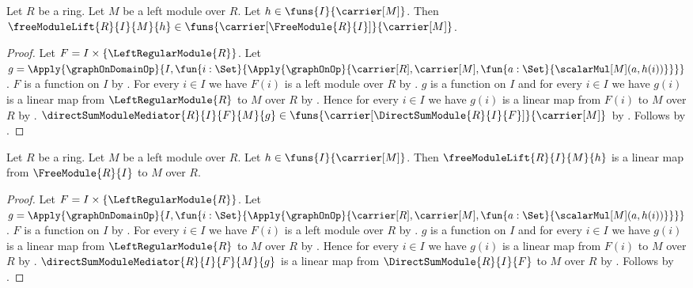 \begin{proposition}\label{free_module_lift_type}
    Let $R$ be a ring.
    Let $M$ be a left module over $R$.
    Let $h\in\funs{I}{\carrier[M]}$.
    Then
        $\freeModuleLift{R}{I}{M}{h}\in
            \funs{\carrier[\FreeModule{R}{I}]}{\carrier[M]}$.
\end{proposition}
\begin{proof}
    Let $F=I\times\{\LeftRegularModule{R}\}$.
    Let
        $g=\Apply{\graphOnDomainOp}{
            I,\fun{i:\Set}{
                \Apply{\graphOnOp}{
                    \carrier[R],\carrier[M],
                    \fun{a:\Set}{\scalarMul[M](a,h(i))}}}}$.
    $F$ is a function on $I$ by
        .
    For every $i\in I$ we have $F(i)$ is a left module over $R$ by
        .
    $g$ is a function on $I$ and for every $i\in I$ we have
        $g(i)$ is a linear map from $\LeftRegularModule{R}$ to $M$ over $R$ by
        .
    Hence for every $i\in I$ we have $g(i)$ is a linear map from
        $F(i)$ to $M$ over $R$ by
        .
    $\directSumModuleMediator{R}{I}{F}{M}{g}\in
        \funs{\carrier[\DirectSumModule{R}{I}{F}]}{\carrier[M]}$ by
        .
    Follows by
        .
\end{proof}

\begin{theorem}\label{free_module_lift_linear}
    Let $R$ be a ring.
    Let $M$ be a left module over $R$.
    Let $h\in\funs{I}{\carrier[M]}$.
    Then $\freeModuleLift{R}{I}{M}{h}$ is a linear map from
        $\FreeModule{R}{I}$ to $M$ over $R$.
\end{theorem}
\begin{proof}
    Let $F=I\times\{\LeftRegularModule{R}\}$.
    Let
        $g=\Apply{\graphOnDomainOp}{
            I,\fun{i:\Set}{
                \Apply{\graphOnOp}{
                    \carrier[R],\carrier[M],
                    \fun{a:\Set}{\scalarMul[M](a,h(i))}}}}$.
    $F$ is a function on $I$ by
        .
    For every $i\in I$ we have $F(i)$ is a left module over $R$ by
        .
    $g$ is a function on $I$ and for every $i\in I$ we have
        $g(i)$ is a linear map from $\LeftRegularModule{R}$ to $M$ over $R$ by
        .
    Hence for every $i\in I$ we have $g(i)$ is a linear map from
        $F(i)$ to $M$ over $R$ by
        .
    $\directSumModuleMediator{R}{I}{F}{M}{g}$ is a linear map from
        $\DirectSumModule{R}{I}{F}$ to $M$ over $R$ by
        .
    Follows by
        .
\end{proof}

